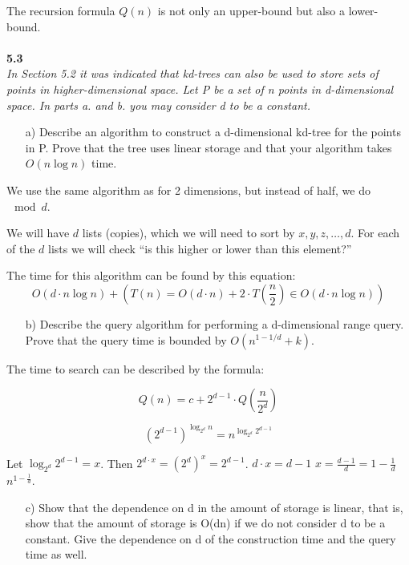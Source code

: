 The recursion formula $Q(n)$ is not only an upper-bound but also a lower-bound.
\\\\
\noindent
\textbf{5.3}\\
\noindent
\textit{In Section 5.2 it was indicated that kd-trees can also be used to store sets of points in higher-dimensional space. Let P be a set of n points in d-dimensional space. In parts a. and b. you may consider d to be a constant.}

\begin{enumerate}
	\item[a) ] Describe an algorithm to construct a d-dimensional kd-tree for the points in P. Prove that the tree uses linear storage and that your algorithm takes $O(n \log n)$ time.
\end{enumerate}
We use the same algorithm as for 2 dimensions, but instead of half, we do $\mod d$.

We will have $d$ lists (copies), which we will need to sort by $x, y, z, \ldots, d$. For each of the $d$ lists we will check ``is this higher or lower than this element?''

The time for this algorithm can be found by this equation:
\begin{equation*}
	O(d \cdot n \log n) + (T(n) = O(d \cdot n) + 2 \cdot T(\frac{n}{2}) \in O(d \cdot n \log n))
\end{equation*}



\begin{enumerate}
	\item[b) ] Describe the query algorithm for performing a d-dimensional range query. Prove that the query time is bounded by $O(n^{1 - 1/d} + k)$.
\end{enumerate}


The time to search can be described by the formula:

\begin{equation*}
	Q(n) = c + 2^{d-1} \cdot Q \left( \frac{n}{2^{d}} \right)
\end{equation*}

\begin{equation*}
	(2^{d-1})^{\log_{2^{d}}n} = n^{\log_{2^{d}} 2^{d-1}}
\end{equation*}

Let $\log_{2^{d}} 2^{d-1} = x$. Then $2^{d\cdot x} = (2^{d})^{x} = 2^{d-1}$.
$d \cdot x = d-{1}$
$x = \frac{d-1}{d} = 1 - \frac{1}{d}$
$n^{1- \frac{1}{d}}$.


\begin{enumerate}
	\item[c) ] Show that the dependence on d in the amount of storage is linear, that is, show that the amount of storage is O(dn) if we do not consider d to be a constant. Give the dependence on d of the construction time and the query time as well.
\end{enumerate}

